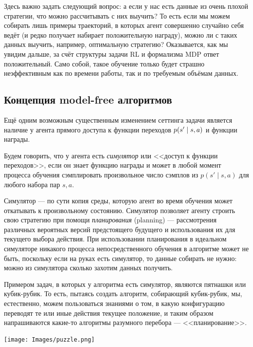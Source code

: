 Здесь важно задать следующий вопрос: а если у нас есть данные из очень плохой стратегии, что можно рассчитывать с них выучить? То есть если мы можем собирать лишь примеры траекторий, в которых агент совершенно случайно себя ведёт (и редко получает набирает положительную награду), можно ли с таких данных выучить, например, оптимальную стратегию? Оказывается, как мы увидим дальше, за счёт структуры задачи RL и формализма MDP ответ положительный. Само собой, такое обучение только будет страшно неэффективным как по времени работы, так и по требуемым объёмам данных.

\subsection{Концепция model-free алгоритмов}

Ещё одним возможным существенным изменением сеттинга задачи является наличие у агента прямого доступа к функции переходов $p(s' \HM\mid s, a)$ и функции награды.

\begin{definition}
Будем говорить, что у агента есть \emph{симулятор} или <<доступ к функции переходов>>, если он знает функцию награды и может в любой момент процесса обучения сэмплировать произвольное число сэмплов из $p(s' \mid s, a)$ для любого набора пар $s, a$.
\end{definition}

Симулятор --- по сути копия среды, которую агент во время обучения может откатывать к произвольному состоянию. Симулятор позволяет агенту строить свою стратегию при помощи \emph{планирования} (planning) --- рассмотрения различных вероятных версий предстоящего будущего и использования их для текущего выбора действия. При использовании планирования в идеальном симуляторе никакого процесса непосредственного обучения в алгоритме может не быть, поскольку если на руках есть симулятор, то данные собирать не нужно: можно из симулятора сколько захотим данных получить.

\begin{exampleBox}[righthand ratio=0.15, sidebyside, sidebyside align=center, lower separated=false]{}
Примером задач, в которых у алгоритма есть симулятор, являются пятнашки или кубик-рубик. То есть, пытаясь создать алгоритм, собирающий кубик-рубик, мы, естественно, можем пользоваться знаниями о том, в какую конфигурацию переводят те или иные действия текущее положение, и таким образом напрашиваются какие-то алгоритмы разумного перебора --- <<планирование>>.

\tcblower
\texttt{[image: Images/puzzle.png]}
\end{exampleBox}


